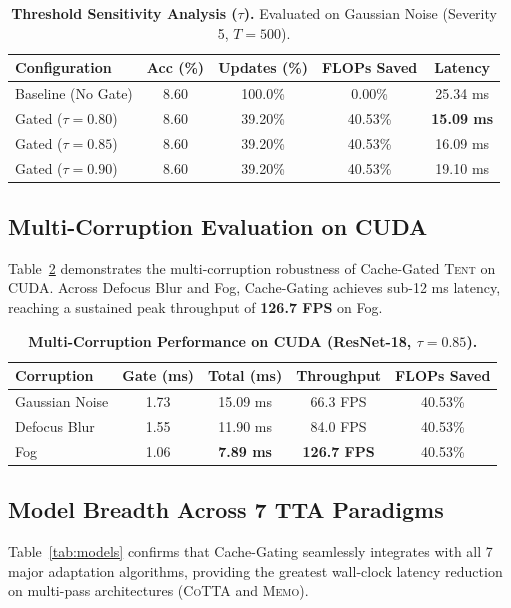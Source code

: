 \documentclass[10pt,twocolumn,letterpaper]{article}
\begin{document}
\begin{table}[h]
\centering
\caption{\textbf{Threshold Sensitivity Analysis ($\tau$).} Evaluated on Gaussian Noise (Severity 5, $T=500$).}
\label{tab:threshold}
\small
\begin{tabular}{lcccc}
\toprule
\textbf{Configuration} & \textbf{Acc (\%)} & \textbf{Updates (\%)} & \textbf{FLOPs Saved} & \textbf{Latency} \\
\midrule
Baseline (No Gate) & 8.60 & 100.0\% & 0.00\% & 25.34 ms \\
Gated ($\tau = 0.80$) & 8.60 & 39.20\% & 40.53\% & \textbf{15.09 ms} \\
Gated ($\tau = 0.85$) & 8.60 & 39.20\% & 40.53\% & 16.09 ms \\
Gated ($\tau = 0.90$) & 8.60 & 39.20\% & 40.53\% & 19.10 ms \\
\bottomrule
\end{tabular}
\end{table}

\subsection{Multi-Corruption Evaluation on CUDA}
Table~\ref{tab:corruptions} demonstrates the multi-corruption robustness of Cache-Gated \textsc{Tent} on CUDA. Across Defocus Blur and Fog, Cache-Gating achieves sub-12 ms latency, reaching a sustained peak throughput of \textbf{126.7 FPS} on Fog.

\begin{table}[h]
\centering
\caption{\textbf{Multi-Corruption Performance on CUDA (ResNet-18, $\tau=0.85$).}}
\label{tab:corruptions}
\small
\begin{tabular}{lcccc}
\toprule
\textbf{Corruption} & \textbf{Gate (ms)} & \textbf{Total (ms)} & \textbf{Throughput} & \textbf{FLOPs Saved} \\
\midrule
Gaussian Noise & 1.73 & 15.09 ms & 66.3 FPS & 40.53\% \\
Defocus Blur & 1.55 & 11.90 ms & 84.0 FPS & 40.53\% \\
Fog & 1.06 & \textbf{7.89 ms} & \textbf{126.7 FPS} & 40.53\% \\
\bottomrule
\end{tabular}
\end{table}

\subsection{Model Breadth Across 7 TTA Paradigms}
Table~\ref{tab:models} confirms that Cache-Gating seamlessly integrates with all 7 major adaptation algorithms, providing the greatest wall-clock latency reduction on multi-pass architectures (\textsc{CoTTA} and \textsc{Memo}).
\end{document}
